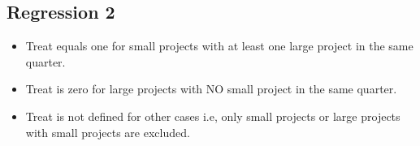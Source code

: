 \documentclass[
]{article}
\providecommand{\tightlist}{%
  \setlength{\itemsep}{0pt}\setlength{\parskip}{0pt}}
\begin{document}
\hypertarget{regression-2}{%
\subsection{Regression 2}\label{regression-2}}

\begin{itemize}
\tightlist
\item
  Treat equals one for small projects with at least one large project in
  the same quarter.
\item
  Treat is zero for large projects with NO small project in the same
  quarter.
\item
  Treat is not defined for other cases i.e, only small projects or large
  projects with small projects are excluded.
\end{itemize}
\end{document}

